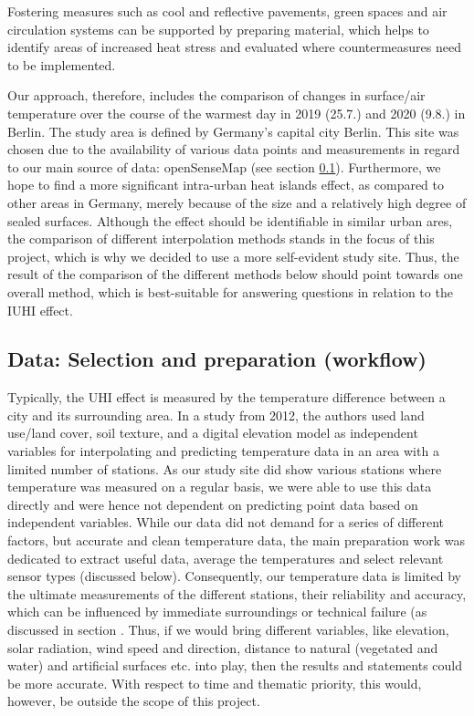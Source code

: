 Fostering measures such as cool and reflective pavements, green spaces and air circulation systems \cite{mohajerani_urban_2017} can be supported by preparing material, which helps to identify areas of increased heat stress and evaluated where countermeasures need to be implemented.

Our approach, therefore, includes the comparison of changes in surface/air temperature over the course of the warmest day in 2019 (25.7.) and 2020 (9.8.) in Berlin. The study area is defined by Germany’s capital city Berlin. This site was chosen due to the availability of various data points and measurements in regard to our main source of data: openSenseMap (see section \ref{sec:data}). Furthermore, we hope to find a more significant intra-urban heat islands effect, as compared to other areas in Germany, merely because of the size and a relatively high degree of sealed surfaces. \cite{gdv_munchen_2018} Although the effect should be identifiable in similar urban ares, the comparison of different interpolation methods stands in the focus of this project, which is why we decided to use a more self-evident study site. Thus, the result of the comparison of the different methods below should point towards one overall method, which is best-suitable for answering questions in relation to the IUHI effect. 

\subsection{Data: Selection and preparation (workflow)}
\label{sec:data}

Typically, the UHI effect is measured by the temperature difference between a city and its surrounding area.\cite{us_epa_learn_2014} In a study from 2012, the authors used land use/land cover, soil texture, and a digital elevation model as independent variables for interpolating and predicting temperature data in an area with a limited number of stations.\cite{samanta_interpolation_2012} As our study site did show various stations where temperature was measured on a regular basis, we were able to use this data directly and were hence not dependent on predicting point data based on independent variables. While our data did not demand for a series of different factors, but accurate and \ldq{}clean\rdq{} temperature data, the main preparation work was dedicated to extract useful data, average the temperatures and select relevant sensor types (discussed below). Consequently, our temperature data is limited by the ultimate measurements of the different stations, their reliability and accuracy, which can be influenced by immediate surroundings or technical failure (as discussed in section
. Thus, if we would bring different variables, like elevation, solar radiation, wind speed and direction, distance to natural (vegetated and water) and artificial surfaces etc. into play, then the results and statements could be more accurate. With respect to time and thematic priority, this would, however, be outside the scope of this project.


